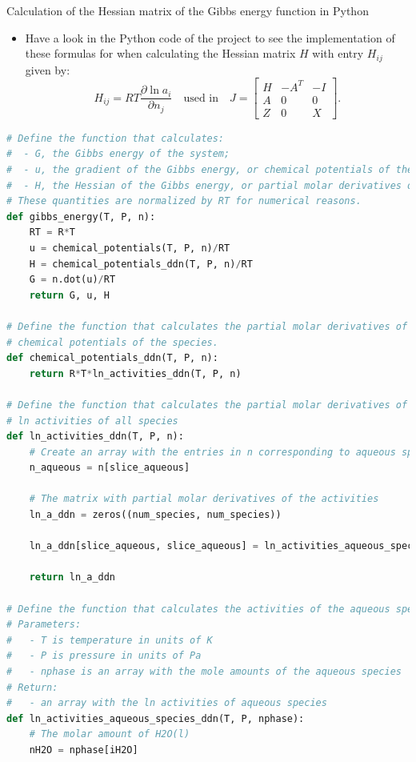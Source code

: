 \begin{frame}{Calculation of the Hessian matrix of the Gibbs energy function in Python}
\begin{itemize}
\item Have a look in the Python code of the project to see the implementation
of these formulas for when calculating the Hessian matrix $H$ with
entry $H_{ij}$ given by:
\[
H_{ij}=RT\frac{\partial\ln a_{i}}{\partial n_{j}} 
\quad
\mbox{used in}
\quad
J=\begin{bmatrix}
	H & -A^{T} & -I\\
	A & 0 & 0\\
	Z & 0 & X
\end{bmatrix}.
\]
\end{itemize}

\begin{lstlisting}[language=Python, caption=Calculating Jacobian using Python]
# Define the function that calculates:
#  - G, the Gibbs energy of the system;
#  - u, the gradient of the Gibbs energy, or chemical potentials of the species
#  - H, the Hessian of the Gibbs energy, or partial molar derivatives of activities
# These quantities are normalized by RT for numerical reasons.
def gibbs_energy(T, P, n):
	RT = R*T
	u = chemical_potentials(T, P, n)/RT
	H = chemical_potentials_ddn(T, P, n)/RT
	G = n.dot(u)/RT
	return G, u, H

# Define the function that calculates the partial molar derivatives of the
# chemical potentials of the species.
def chemical_potentials_ddn(T, P, n):
	return R*T*ln_activities_ddn(T, P, n)
	
# Define the function that calculates the partial molar derivatives of the
# ln activities of all species
def ln_activities_ddn(T, P, n):
	# Create an array with the entries in n corresponding to aqueous species
	n_aqueous = n[slice_aqueous]
	
	# The matrix with partial molar derivatives of the activities
	ln_a_ddn = zeros((num_species, num_species))
	
	ln_a_ddn[slice_aqueous, slice_aqueous] = ln_activities_aqueous_species_ddn(T, P, n_aqueous)
	
	return ln_a_ddn

# Define the function that calculates the activities of the aqueous species.
# Parameters:
#   - T is temperature in units of K
#   - P is pressure in units of Pa
#   - nphase is an array with the mole amounts of the aqueous species
# Return:
#   - an array with the ln activities of aqueous species
def ln_activities_aqueous_species_ddn(T, P, nphase):
	# The molar amount of H2O(l)
	nH2O = nphase[iH2O]
	

\end{lstlisting}
\end{frame}
